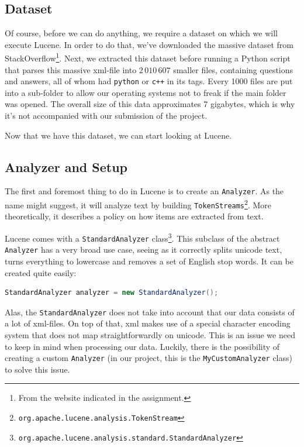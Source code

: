 \documentclass[11pt]{article}
\begin{document}
\subsection{Dataset}
Of course, before we can do anything, we require a dataset on which we will execute Lucene. In order to do that, we've downloaded the massive dataset from StackOverflow\footnote{From the website indicated in the assignment.}. Next, we extracted this dataset before running a Python script that parses this massive xml-file into $2\,010\,607$ smaller files, containing questions and answers, all of whom had \texttt{python} or \texttt{c++} in its tags. Every 1000 files are put into a sub-folder to allow our operating systems not to freak if the main folder was opened. The overall size of this data approximates 7 gigabytes, which is why it's not accompanied with our submission of the project.

Now that we have this dataset, we can start looking at Lucene.

\subsection{Analyzer and Setup}\label{sec:analysetup}
The first and foremost thing to do in Lucene is to create an \texttt{Analyzer}. As the name might suggest, it will analyze text by building \texttt{TokenStreams}\footnote{\texttt{org.apache.lucene.analysis.TokenStream}}. More theoretically, it describes a policy on how items are extracted from text.

Lucene comes with a \texttt{StandardAnalyzer} class\footnote{\texttt{org.apache.lucene.analysis.standard.StandardAnalyzer}}. This subclass of the abstract \texttt{Analyzer} has a very broad use case, seeing as it correctly splits unicode text, turns everything to lowercase and removes a set of English stop words. It can be created quite easily:
\begin{lstlisting}[language=Java]
StandardAnalyzer analyzer = new StandardAnalyzer();
\end{lstlisting}

Alas, the \texttt{StandardAnalyzer} does not take into account that our data consists of a lot of xml-files. On top of that, xml makes use of a special character encoding system that does not map straightforwardly on unicode. This is an issue we need to keep in mind when processing our data. Luckily, there is the possibility of creating a custom \texttt{Analyzer} (in our project, this is the \texttt{MyCustomAnalyzer} class) to solve this issue.
\end{document}
